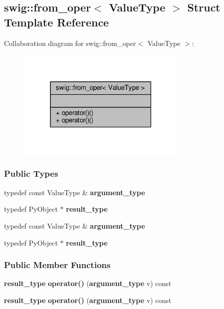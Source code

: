 \subsection{swig\+:\+:from\+\_\+oper$<$ Value\+Type $>$ Struct Template Reference}
\label{structswig_1_1from__oper}


Collaboration diagram for swig\+:\+:from\+\_\+oper$<$ Value\+Type $>$\+:
\nopagebreak
\begin{figure}[H]
\begin{center}
\leavevmode
\includegraphics[width=231pt]{d5/d58/structswig_1_1from__oper__coll__graph}
\end{center}
\end{figure}
\subsubsection*{Public Types}
\begin{DoxyCompactItemize}
\item 
typedef const Value\+Type \& {\bf argument\+\_\+type}
\item 
typedef Py\+Object $\ast$ {\bf result\+\_\+type}
\item 
typedef const Value\+Type \& {\bf argument\+\_\+type}
\item 
typedef Py\+Object $\ast$ {\bf result\+\_\+type}
\end{DoxyCompactItemize}
\subsubsection*{Public Member Functions}
\begin{DoxyCompactItemize}
\item 
{\bf result\+\_\+type} {\bf operator()} ({\bf argument\+\_\+type} v) const 
\item 
{\bf result\+\_\+type} {\bf operator()} ({\bf argument\+\_\+type} v) const 
\end{DoxyCompactItemize}


